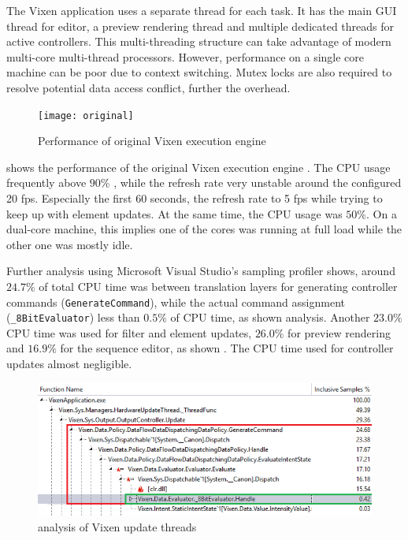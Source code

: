 The Vixen application uses a separate thread for each task. It has the main GUI thread for editor, a preview rendering thread and multiple dedicated threads for active controllers. This multi-threading structure can take advantage of modern multi-core multi-thread processors. However, performance on a single core machine can be poor due to context switching. Mutex locks are also required to resolve potential data access conflict, further  the overhead.

\begin{figure}[t]
  \centering
  \texttt{[image: original]}
  \caption{\footnotesize Performance of original Vixen execution engine}
  \label{fig:original}
\end{figure}

 shows the performance of the original Vixen execution engine . The CPU usage frequently  above $90 \%$ , while the refresh rate  very unstable around the configured 20 fps. Especially  the first 60 seconds, the refresh rate  to 5 fps while trying to keep up with element updates. At the same time, the CPU usage was  $50 \%$. On a dual-core machine, this implies one of the cores was running at full load while the other one was mostly idle.

Further analysis using Microsoft Visual Studio's sampling profiler shows, around $24.7 \%$ of total CPU time was  between translation layers for generating controller commands (\texttt{GenerateCommand}), while the actual command assignment (\texttt{\_8BitEvaluator})  less than $0.5 \%$ of CPU time, as shown    analysis. Another $23.0 \%$ CPU time was used for filter and element updates, $26.0 \%$ for preview rendering and $16.9 \%$ for the sequence editor, as shown  . The CPU time used for controller updates  almost negligible.

\begin{figure}[t]
  \centering
  \includegraphics[width=0.85\columnwidth]{Figs/vixen_perf_original.png}
  \caption{\footnotesize {} analysis of Vixen update threads}
  \label{fig:vixen_perf_original}
\end{figure}

